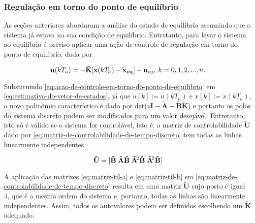 \subsubsection{Regulação em torno do ponto de equilíbrio}
\label{subsub:regulacao-em-torno-do-ponto-de-equilibrio}

As seções anteriores abordaram a análise do estado de equilíbrio assumindo que o
sistema já estava na sua condição de equilíbrio. Entretanto, para levar o sistema
ao equilíbrio é preciso aplicar uma ação de controle de regulação em torno do
ponto de equilíbrio, dada por

\begin{equation}
    \label{eq:acao-de-controle-em-torno-do-ponto-de-equilibrio}
    \mathbf{u}(kT_a) = -\mathbf{\tilde{K}}[\mathbf{x}(kT_a) - \mathbf{x_{eq}}]+\mathbf{u}_{eq}, 
    \thickspace k = 0, 1, 2, ..., n.
\end{equation}

Substituindo \ref{eq:acao-de-controle-em-torno-do-ponto-de-equilibrio} em
\ref{eq:estimativa-do-vetor-de-estados}, já que $u[k] := u(kT_a)$ e $x[k] :=
x(kT_a)$, o novo polinômio característico é dado por
det($z\mathbf{I}-\mathbf{\tilde{A}}-\mathbf{\tilde{B}}\mathbf{\tilde{K}}$) e
portanto os polos do sistema discreto podem ser modificados para um valor
desejável. Entretanto, isto só é válido se o sistema for controlável, isto é, a
matriz de controlabilidade $\mathbf{\tilde{U}}$ dado por
\ref{eq:matriz-de-controlabilidade-de-tempo-discreto} tem todas as linhas
linearmente independentes.

\begin{equation}
    \label{eq:matriz-de-controlabilidade-de-tempo-discreto}
    \mathbf{\tilde{U}} = [
    \mathbf{\tilde{B}}
    \thickspace
    \mathbf{\tilde{A}\tilde{B}} 
    \thickspace
    \mathbf{\tilde{A}}\negthinspace^{2}\mathbf{\tilde{B}}
    \thickspace
    \mathbf{\tilde{A}}\negthinspace^{3}\mathbf{\tilde{B}}]
\end{equation}

A aplicação das matrizes \ref{eq:matriz-til-a} e \ref{eq:matriz-til-b} em
\ref{eq:matriz-de-controlabilidade-de-tempo-discreto} resulta em uma matriz
$\mathbf{\tilde{U}}$ cujo posto é igual 4, que é a mesma ordem do sistema e,
portanto, todas as linhas são linearmente independentes. Assim, todos os
autovalores podem ser definidos escolhendo um $\mathbf{\tilde{K}}$ adequado.

